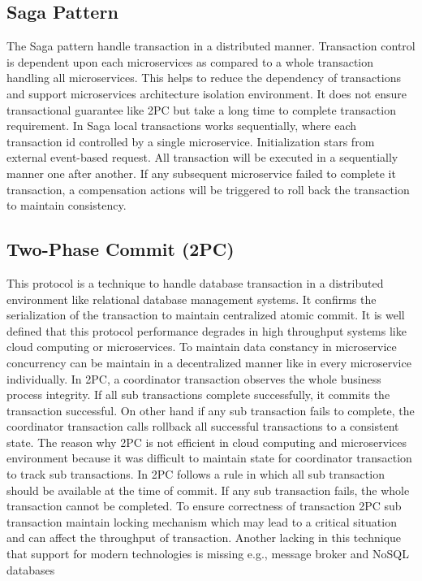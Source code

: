 \documentclass[a4paper,12pt]{article}
\begin{document}
\subsection{Saga Pattern}
The Saga pattern handle transaction in a distributed manner. Transaction control is dependent upon each microservices as compared to a whole transaction handling all microservices. This helps to reduce the dependency of transactions and support microservices architecture isolation environment. It does not ensure transactional guarantee like 2PC but take a long time to complete transaction requirement. In Saga local transactions works sequentially, where each transaction id controlled by a single microservice. Initialization stars from external event-based request. All transaction will be executed in a sequentially manner one after another. If any subsequent microservice failed to complete it transaction, a compensation actions will be triggered to roll back the transaction to maintain consistency. \cite{twentyone, twentytwo, twentythree}  

\subsection{Two-Phase Commit (2PC)}
This protocol is a technique to handle database transaction in a distributed environment like relational database management systems. It confirms the serialization of the transaction to maintain centralized atomic commit. It is well defined that this protocol performance degrades in high throughput systems like cloud computing or microservices. To maintain data constancy in microservice concurrency can be maintain in a decentralized manner like in every microservice individually. In 2PC, a coordinator transaction observes the whole business process integrity. If all sub transactions complete successfully, it commits the transaction successful. On other hand if any sub transaction fails to complete, the coordinator transaction calls rollback all successful transactions to a consistent state. The reason why 2PC is not efficient in cloud computing and microservices environment because it was difficult to maintain state for coordinator transaction to track sub transactions.     
In 2PC follows a rule in which all sub transaction should be available at the time of commit. If any sub transaction fails, the whole transaction cannot be completed. To ensure correctness of transaction 2PC sub transaction maintain locking mechanism which may lead to a critical situation and can affect the throughput of transaction. Another lacking in this technique that support for modern technologies is missing e.g., message broker and NoSQL databases \cite{twenty}
\end{document}
